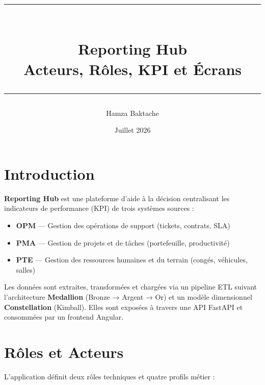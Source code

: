 \documentclass[a4paper,12pt]{article}
\title{
    \vspace{-1cm}
    {\color{primarycolor}\rule{\linewidth}{2pt}}\\[0.5em]
    \textbf{Reporting Hub}\\
    {\large Acteurs, Rôles, KPI et Écrans}\\[0.3em]
    {\color{primarycolor}\rule{\linewidth}{1pt}}
}
\author{Hamza Baktache}
\date{Juillet 2026}
\begin{document}
\maketitle
\tableofcontents
\newpage

\section{Introduction}

\textbf{Reporting Hub} est une plateforme d'aide à la décision centralisant les indicateurs
de performance (KPI) de trois systèmes sources :

\begin{itemize}[leftmargin=1.5cm]
    \item \textbf{OPM} — Gestion des opérations de support (tickets, contrats, SLA)
    \item \textbf{PMA} — Gestion de projets et de tâches (portefeuille, productivité)
    \item \textbf{PTE} — Gestion des ressources humaines et du terrain (congés, véhicules, salles)
\end{itemize}

Les données sont extraites, transformées et chargées via un pipeline ETL suivant
l'architecture \textbf{Medallion} (Bronze → Argent → Or) et un modèle dimensionnel
\textbf{Constellation} (Kimball). Elles sont exposées à travers une API FastAPI
et consommées par un frontend Angular.

\section{Rôles et Acteurs}

L'application définit deux rôles techniques et quatre profils métier :
\end{document}
